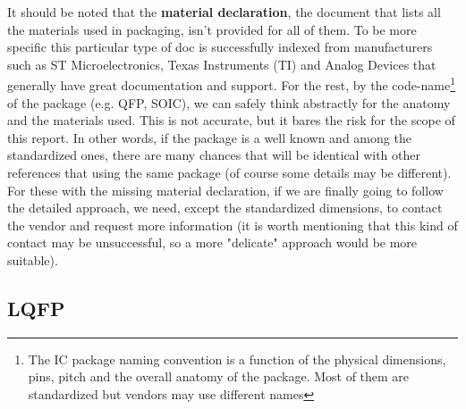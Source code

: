 \documentclass[final]{cubedoc}
\begin{document}
	It should be noted that the \textbf{material declaration}, the document that lists all the materials used in packaging, isn't provided for all of them. To be more specific this particular type of doc is successfully indexed from manufacturers such as ST Microelectronics, Texas Instruments (TI) and Analog Devices that generally have great documentation and support. For the rest, by the code-name\footnote{The IC package naming convention is a function of the physical dimensions, pins, pitch and the overall anatomy of the package. Most of them are standardized but vendors may use different names} of the package (e.g. QFP, SOIC), we can safely think abstractly for the anatomy and the materials used. This is not accurate, but it bares the risk for the scope of this report. In other words, if the package is a well known and among the standardized ones, there are many chances that will be identical with other references that using the same package (of course some details may be different). For these with the missing material declaration, if we are finally going to follow the detailed approach, we need, except the standardized dimensions, to contact the vendor and request more information (it is worth mentioning that this kind of contact may be unsuccessful, so a more "delicate" approach would be more suitable). 
	
	
	
	\subsection{LQFP}
	
\end{document}
